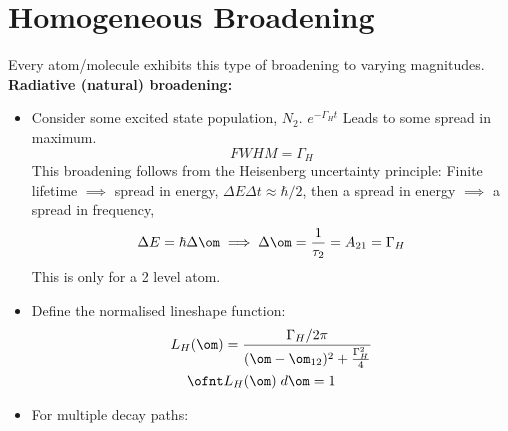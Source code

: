 \documentclass[a4paper, 11pt, normalem]{report}
\begin{document}
\section{Homogeneous Broadening}
Every atom/molecule exhibits this type of broadening to varying magnitudes.\\
\textbf{Radiative (natural) broadening:}
\begin{itemize}
    \item Consider some excited state population, $N_2$. $e^{-\Gamma_Ht}$
        Leads to some spread in maximum.
        \begin{equation}
            FWHM = \Gamma_H
        \end{equation}
        This broadening follows from the Heisenberg uncertainty principle: Finite lifetime $\implies$ spread in energy, $\Delta E\Delta t \approx \hbar/2$, then a spread in energy $\implies$ a spread in frequency,
        \begin{equation}
            \Delta E = \hbar\Delta\om \implies \Delta\om = \frac{1}{\tau_2} = A_{21} = \Gamma_H
        \end{equation}
        This is only for a 2 level atom.
        \begin{figure}[H]
            \centering
        \end{figure}
    \item Define the normalised lineshape function:
        \begin{align}
            L_H(\om) &= \frac{\Gamma_H/2\pi}{(\om-\om_{12})^2+\frac{\Gamma_H^2}{4}} \\
            \ofnt &L_H(\om)\;d\om = 1
        \end{align}
    \item For multiple decay paths:
        \begin{multicols}{2}
        \begin{figure}[H]
            \centering
\end{figure}
\end{multicols}
\end{itemize}
\end{document}
